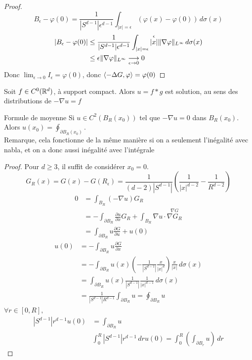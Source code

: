 \documentclass[]{report}
\begin{document}
\begin{proof}
        \[B_{\epsilon}-\varphi(0)=\frac{1}{|S^{d-1}|\epsilon^{d-1}}\int_{|x|=\epsilon}(\varphi(x)-\varphi(0))\, d\sigma(x)\]
        \begin{align*}
            |B_{\epsilon}-\varphi(0)|&\le \frac{1}{|S^{d-1}|\epsilon^{d-1}}\int_{|x|=\epsilon}\overset{\epsilon}{|x|}\lVert \nabla \varphi \rVert_{L^\infty}\, d\sigma(x)\\
            &\le \epsilon \lVert \nabla \varphi \rVert_{L^\infty}\underset{\epsilon\to 0}{\longrightarrow} 0
        \end{align*}
        Donc $\lim_{\epsilon\to 0}I_\epsilon=\varphi(0)$, donc $\langle -\Delta G,\varphi \rangle=\varphi(0)$
    \end{proof}

    \begin{prop}{}{}
        Soit $f\in C^0(\mathbb{R}^d)$, à support compact. Alors $u=f*g$ est solution, au sens des distributions de $-\nabla u=f$
    \end{prop}

    \begin{lm}{Formule de moyenne}{}
        Si $u\in C^2(B_R(x_0))$ tel que $-\nabla u=0$ dans $B_R(x_0)$. Alors $u(x_0)=\oint_{\partial B_R(x_0)}$.\\
        Remarque, cela fonctionne de la même manière si on a seulement l'inégalité avec nabla, et on a donc aussi inégalité avec l'intégrale
    \end{lm}

    \begin{proof}
        Pour $d\ge 3$, il suffit de considérer $x_0=0$.\\
        \[G_R(x)=G(x)-G(R_\epsilon)=\frac{1}{(d-2)|S^{d-1}|}\left(\frac{1}{|x|^{d-2}}-\frac{1}{R^{d-2}}\right)\]
        \begin{align*}
            0&=\int_{B_R} (-\nabla u) G_R\\
            &=-\int_{\partial B_R} \frac{\partial u}{\partial x} G_R+\int_{B_R}\nabla u\cdot \overset{\nabla G}{\nabla G_R}\\
            &=\int_{\partial B_R}u\frac{\partial G}{\partial u}+u(0)
        \end{align*}
        \begin{align*}
            u(0)&=-\int_{\partial B_R} u\frac{\partial G}{\partial x}\\
            &=-\int_{\partial B_R}u(x)\left(-\frac{1}{|S^{d-1}|}\frac{x}{|x|^d}\right)\frac{x}{|x|}\, d\sigma(x)\\
            &=\int_{\partial B_R} u(x)\frac{1}{|S^{d-1}|}\frac{1}{|x|^{d-1}}\, d\sigma(x)\\
            &=\frac{1}{|S^{d-1}|R^{d-1}}\int_{\partial B_R} u=\oint_{\partial B_R} u
        \end{align*}
        $\forall r\in [0,R],$
        \begin{align*}
            |S^{d-1}|r^{d-1}u(0)&=\int_{\partial B_R}u\\
            &\int_{0}^R |S^{d-1}|r^{d-1}\, dr u(0)=\int_{0}^R\left(\int_{\partial B_r} u\right)\, dr
        \end{align*}
    \end{proof}
\end{document}
